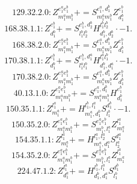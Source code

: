 \documentclass[letterpaper,10pt,fleqn,leqno,onecolumn]{article}
\begin{document}
\begin{equation} \;\;\;\;\;\;  129.32.2.0: Z^{e_{1}^{a}e_{1}^{b}}_{m_{1}^{a}m_{1}^{b}}+=S^{e_{1}^{a},d_{1}^{b}}_{m_{1}^{a}m_{1}^{b}}Z^{e_{1}^{b}}_{d_{1}^{b}} \end{equation}
\begin{equation} \;\;\;\;\;\;  168.38.1.1: Z^{e_{1}^{b}}_{d_{1}^{b}}+=S^{e_{1}^{b},d_{2}^{b}}_{l_{1}^{b}l_{2}^{b}}H^{l_{1}^{b}l_{2}^{b}}_{d_{1}^{b},d_{2}^{b}}\cdot -1. \end{equation}
\begin{equation} \;\;\;\;\;\;  168.38.2.0: Z^{e_{1}^{a}e_{1}^{b}}_{m_{1}^{a}m_{1}^{b}}+=S^{e_{1}^{a},d_{1}^{b}}_{m_{1}^{a}m_{1}^{b}}Z^{e_{1}^{b}}_{d_{1}^{b}} \end{equation}
\begin{equation} \;\;\;\;\;\;  170.38.1.1: Z^{e_{1}^{b}}_{d_{1}^{b}}+=S^{e_{1}^{b},d_{1}^{a}}_{l_{1}^{a}l_{1}^{b}}H^{l_{1}^{a}l_{1}^{b}}_{d_{1}^{b},d_{1}^{a}}\cdot -1. \end{equation}
\begin{equation} \;\;\;\;\;\;  170.38.2.0: Z^{e_{1}^{a}e_{1}^{b}}_{m_{1}^{a}m_{1}^{b}}+=S^{e_{1}^{a},d_{1}^{b}}_{m_{1}^{a}m_{1}^{b}}Z^{e_{1}^{b}}_{d_{1}^{b}} \end{equation}
\begin{equation} \;\;\;\;\;\;  40.13.1.0: Z^{e_{1}^{a}e_{1}^{b}}_{m_{1}^{a}m_{1}^{b}}+=S^{e_{1}^{a},d_{1}^{b}}_{m_{1}^{a}m_{1}^{b}}H^{e_{1}^{b}}_{d_{1}^{b}} \end{equation}
\begin{equation} \;\;\;\;\;\;  150.35.1.1: Z^{l_{1}^{a}}_{m_{1}^{a}}+=H^{l_{1}^{b},l_{1}^{a}}_{m_{1}^{a},d_{1}^{b}}S^{d_{1}^{b}}_{l_{1}^{b}}\cdot -1. \end{equation}
\begin{equation} \;\;\;\;\;\;  150.35.2.0: Z^{e_{1}^{a}e_{1}^{b}}_{m_{1}^{a}m_{1}^{b}}+=S^{e_{1}^{a}e_{1}^{b}}_{m_{1}^{b},l_{1}^{a}}Z^{l_{1}^{a}}_{m_{1}^{a}} \end{equation}
\begin{equation} \;\;\;\;\;\;  154.35.1.1: Z^{l_{1}^{a}}_{m_{1}^{a}}+=H^{l_{1}^{a},l_{2}^{a}}_{m_{1}^{a},d_{1}^{a}}S^{d_{1}^{a}}_{l_{2}^{a}} \end{equation}
\begin{equation} \;\;\;\;\;\;  154.35.2.0: Z^{e_{1}^{a}e_{1}^{b}}_{m_{1}^{a}m_{1}^{b}}+=S^{e_{1}^{a}e_{1}^{b}}_{m_{1}^{b},l_{1}^{a}}Z^{l_{1}^{a}}_{m_{1}^{a}} \end{equation}
\begin{equation} \;\;\;\;\;\;  224.47.1.2: Z^{l_{1}^{a}}_{d_{1}^{a}}+=H^{l_{1}^{b},l_{1}^{a}}_{d_{1}^{b},d_{1}^{a}}S^{d_{1}^{b}}_{l_{1}^{b}} \end{equation}
\end{document}
